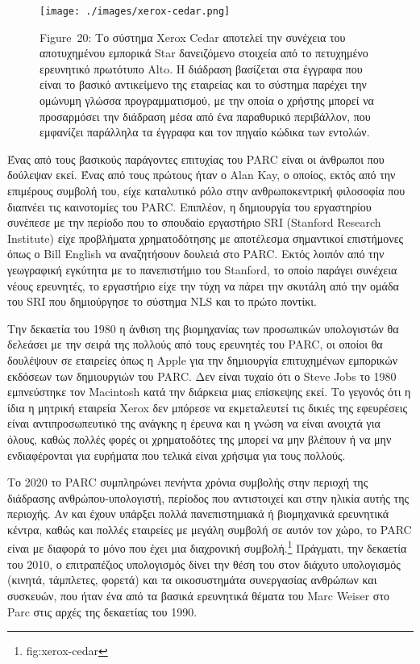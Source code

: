 \documentclass[
]{article}
\begin{document}
\leavevmode{}%
\begin{figure}
\hypertarget{fig:xerox-cedar}{%
\centering
\texttt{[image: ./images/xerox-cedar.png]}
\caption{Figure~20: Το σύστημα Xerox Cedar αποτελεί την συνέχεια του
αποτυχημένου εμπορικά Star δανειζόμενο στοιχεία από το πετυχημένο
ερευνητικό πρωτότυπο Alto. Η διάδραση βασίζεται στα έγγραφα που είναι το
βασικό αντικείμενο της εταιρείας και το σύστημα παρέχει την ομώνυμη
γλώσσα προγραμματισμού, με την οποία ο χρήστης μπορεί να προσαρμόσει την
διάδραση μέσα από ένα παραθυρικό περιβάλλον, που εμφανίζει παράλληλα τα
έγγραφα και τον πηγαίο κώδικα των εντολών.}\label{fig:xerox-cedar}
}
\end{figure}

Ένας από τους βασικούς παράγοντες επιτυχίας του PARC είναι οι άνθρωποι
που δούλεψαν εκεί. Ένας από τους πρώτους ήταν ο Alan Kay, ο οποίος,
εκτός από την επιμέρους συμβολή του, είχε καταλυτικό ρόλο στην
ανθρωποκεντρική φιλοσοφία που διαπνέει τις καινοτομίες του PARC.
Επιπλέον, η δημιουργία του εργαστηρίου συνέπεσε με την περίοδο που το
σπουδαίο εργαστήριο SRI (Stanford Research Institute) είχε προβλήματα
χρηματοδότησης με αποτέλεσμα σημαντικοί επιστήμονες όπως ο Bill English
να αναζητήσουν δουλειά στο PARC. Εκτός λοιπόν από την γεωγραφική
εγκύτητα με το πανεπιστήμιο του Stanford, το οποίο παράγει συνέχεια
νέους ερευνητές, το εργαστήριο είχε την τύχη να πάρει την σκυτάλη από
την ομάδα του SRI που δημιούργησε το σύστημα NLS και το πρώτο ποντίκι.

Την δεκαετία του 1980 η άνθιση της βιομηχανίας των προσωπικών
υπολογιστών θα δελεάσει με την σειρά της πολλούς από τους ερευνητές του
PARC, οι οποίοι θα δουλέψουν σε εταιρείες όπως η Apple για την
δημιουργία επιτυχημένων εμπορικών εκδόσεων των δημιουργιών του PARC. Δεν
είναι τυχαίο ότι ο Steve Jobs το 1980 εμπνεύστηκε τον Macintosh κατά την
διάρκεια μιας επίσκεψης εκεί. Το γεγονός ότι η ίδια η μητρική εταιρεία
Xerox δεν μπόρεσε να εκμεταλευτεί τις δικιές της εφευρέσεις είναι
αντιπροσωπευτικό της ανάγκης η έρευνα και η γνώση να είναι ανοιχτά για
όλους, καθώς πολλές φορές οι χρηματοδότες της μπορεί να μην βλέπουν ή να
μην ενδιαφέρονται για ευρήματα που τελικά είναι χρήσιμα για τους
πολλούς.

Το 2020 το PARC συμπληρώνει πενήντα χρόνια συμβολής στην περιοχή της
διάδρασης ανθρώπου-υπολογιστή, περίοδος που αντιστοιχεί και στην ηλικία
αυτής της περιοχής. Αν και έχουν υπάρξει πολλά πανεπιστημιακά ή
βιομηχανικά ερευνητικά κέντρα, καθώς και πολλές εταιρείες με μεγάλη
συμβολή σε αυτόν τον χώρο, το PARC είναι με διαφορά το μόνο που έχει μια
διαχρονική συμβολή.\footnote{fig:xerox-cedar} Πράγματι, την δεκαετία του
2010, ο επιτραπέζιος υπολογισμός δίνει την θέση του στον διάχυτο
υπολογισμός (κινητά, τάμπλετες, φορετά) και τα οικοσυστημάτα συνεργασίας
ανθρώπων και συσκευών, που ήταν ένα από τα βασικά ερευνητικά θέματα του
Marc Weiser στο Parc στις αρχές της δεκαετίας του 1990.
\end{document}
